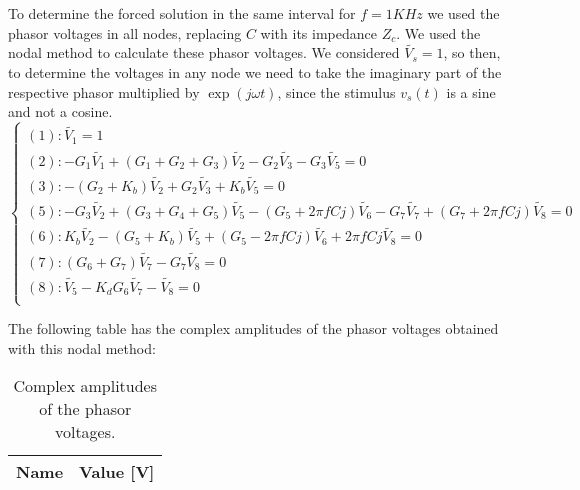 To determine the forced solution in the same interval for $f=1KHz$ we used the phasor voltages in all nodes, replacing $C$ with its impedance $Z_{c}$.
 We used the nodal method to calculate these phasor voltages. We considered $\tilde{V_{s}}=1$, so then, to determine 
 the voltages in any node we need to 
 take the imaginary part of the respective phasor multiplied by $\exp(j\omega t)$, 
 since the stimulus $v_{s}\left(t\right)$ is a sine and not a cosine.  
\begin{equation}
  \begin{cases}
    \left(1\right): \tilde{V_{1}}=1                                                                                                                        \\
    \left(2\right): -G_{1}\tilde{V_{1}}+\left(G_{1}+G_{2}+G_{3}\right)\tilde{V_{2}}-G_{2}\tilde{V_{3}}-G_{3}\tilde{V_{5}}=0                                                        \\
    \left(3\right): -\left(G_{2}+K_{b}\right)\tilde{V_{2}}+G_{2}\tilde{V_{3}}+K_{b}\tilde{V_{5}}=0                                                                         \\
    \left(5\right): -G_{3}\tilde{V_{2}}+\left(G_{3}+G_{4}+G_{5}\right)\tilde{V_{5}}-\left(G_{5}+2\pi fCj\right)\tilde{V_{6}}-G_{7}\tilde{V_{7}}+\left(G_{7}+2\pi fCj\right)\tilde{V_{8}}=0 \\
    \left(6\right): K_{b}\tilde{V_{2}}-\left(G_{5}+K_{b}\right)\tilde{V_{5}} +\left(G_{5}-2\pi fCj\right)\tilde{V_{6}}+2\pi fCj\tilde{V_{8}}=0                                     \\
    \left(7\right): \left(G_{6}+G_{7}\right)\tilde{V_{7}}-G_{7}\tilde{V_{8}}=0                                                                                     \\
    \left(8\right): \tilde{V_{5}}-K_{d}G_{6}\tilde{V_{7}}-\tilde{V_{8}}=0                                                                                                   \\
  \end{cases}
\end{equation}

The following table has the complex amplitudes of the phasor voltages obtained with this nodal method:

\begin{table}[h]
  \centering
  \begin{tabular}{|l|r|}
    \hline
    {\bf Name} & {\bf Value [V]} \\ \hline
    
  \end{tabular}
  \caption{Complex amplitudes of the phasor voltages.}
  \label{tab:3}
\end{table}

